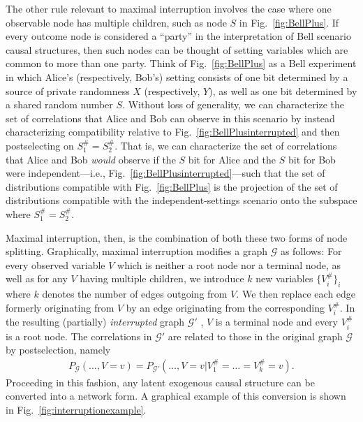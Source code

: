 \documentclass[superscriptaddress,aps,prx,nofootinbib,twocolumn,twoside,reprint,letterpaper,longbibliography]{revtex4-2}
\begin{document}
The other rule relevant to maximal interruption involves the case where one observable node has multiple children, such as node $S$ in Fig.~\ref{fig:BellPlus}. If every outcome node is considered a ``party'' in the interpretation of Bell scenario causal structures, then such nodes can be thought of setting variables which are common to more than one party. Think of Fig.~\ref{fig:BellPlus} as a Bell experiment in which Alice's (respectively, Bob's) setting consists of one bit determined by a source of private randomness $X$ (respectively, $Y$), as well as one bit determined by a shared random number $S$. Without loss of generality, we can characterize the set of correlations that Alice and Bob can observe in this scenario by instead characterizing compatibility relative to Fig.~\ref{fig:BellPlusinterrupted} and then postselecting on $S^{\#}_1{=}S^{\#}_2$. That is, we can characterize the set of correlations that Alice and Bob \emph{would} observe if the $S$ bit for Alice and the $S$ bit for Bob were independent---i.e., Fig.~\ref{fig:BellPlusinterrupted}---such that the set of distributions compatible with Fig.~\ref{fig:BellPlus} is the projection of the set of distributions compatible with the independent-settings scenario onto the subspace where $S^{\#}_1{=}S^{\#}_2$.

Maximal interruption, then, is the combination of both these two forms of node splitting. Graphically, maximal interruption modifies a graph $\mathcal{G}$ as follows: For every observed variable $V$ which is neither a root node nor a terminal node, as well as for any $V$ having multiple children, we introduce $k$ new variables $\{V^{\#}_i\}_i$ where $k$ denotes the number of edges outgoing from $V$. We then replace each edge formerly originating from $V$ by an edge originating from the corresponding $V^{\#}_i$.  In the resulting (partially) \emph{interrupted} graph $\mathcal{G}'$ , $V$ is a terminal node and every $V^{\#}_i$ is a root node. The correlations in $\mathcal{G}'$ are related to those in the original graph $\mathcal{G}$ by postselection, namely
\begin{align}\label{eq:interruptioncondition}
P_{\mathcal{G}}(\dots,V{=}v) = P_{\mathcal{G}'}(\dots,V{=}v|V^{\#}_1{=}\dots{=}V^{\#}_k{=}v).
\end{align}
Proceeding in this fashion, any latent exogenous causal structure can be converted into a network form.
A graphical example of this conversion is shown in Fig.~\ref{fig:interruptionexample}.
\end{document}
